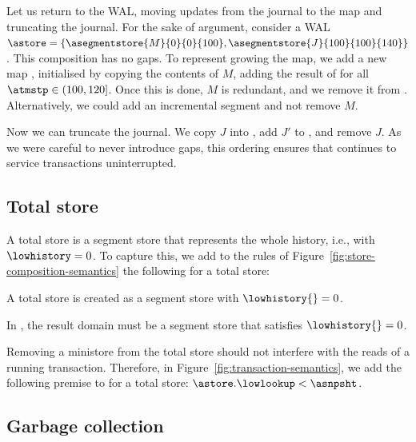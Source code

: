 Let us return to the WAL, moving updates from the journal to the map and
truncating the journal.
For the sake of argument, consider a WAL
$\astore = \{
\asegmentstore{M}{0}{0}{100},
\asegmentstore{J}{100}{100}{140} \}$.
This composition has no gaps.
To represent growing the map, we add a new map
, initialised by copying the contents of
$M$, adding the result of \cmdLookup{\astore{}}{\akey{}}{\atmstp{}} for
all $\atmstp \in (100,120]$.
Once this is done, $M$ is redundant, and we remove it from \astore{}.
Alternatively, we could add an incremental segment
 and not remove $M$.

Now we can truncate the journal.
We copy $J$ into , add $J'$ to
\astore{}, and remove $J$.
As we were careful to never introduce gaps, this ordering ensures that
\astore{} continues to service transactions uninterrupted.

\subsection{Total store}
\label{sec:total}

A total store is a segment store that represents the whole history,
i.e., with $\lowhistory = 0$.
To capture this, we add to the rules of
Figure~\ref{fig:store-composition-semantics} the following for a total
store:
\begin{inparaitem}
\item
  A total store is created as a segment store with
  $\lowhistory{}=0$.
\item
  In \rmvminirule{}, the result domain \adomain[\astore'] must be a
  segment store that satisfies $\lowhistory{}=0$.
\end{inparaitem}

Removing a ministore from the total store should not interfere with the
reads of a running transaction.
Therefore, in Figure~\ref{fig:transaction-semantics}, we add the
following premise to \commitrule{} for a total store:
$\astore.\lowlookup < \asnpsht$.


\subsection{Garbage collection}
\label{sec:gc}

